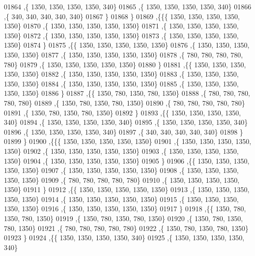 \begin{DoxyCode}
01864    ,\{  1350,  1350,  1350,  1350,   340\}
01865    ,\{  1350,  1350,  1350,  1350,   340\}
01866    ,\{   340,   340,   340,   340,   340\}
01867    \}
01868   \}
01869  ,\{\{\{  1350,  1350,  1350,  1350,  1350\}
01870    ,\{  1350,  1350,  1350,  1350,  1350\}
01871    ,\{  1350,  1350,  1350,  1350,  1350\}
01872    ,\{  1350,  1350,  1350,  1350,  1350\}
01873    ,\{  1350,  1350,  1350,  1350,  1350\}
01874    \}
01875   ,\{\{  1350,  1350,  1350,  1350,  1350\}
01876    ,\{  1350,  1350,  1350,  1350,  1350\}
01877    ,\{  1350,  1350,  1350,  1350,  1350\}
01878    ,\{   780,   780,   780,   780,   780\}
01879    ,\{  1350,  1350,  1350,  1350,  1350\}
01880    \}
01881   ,\{\{  1350,  1350,  1350,  1350,  1350\}
01882    ,\{  1350,  1350,  1350,  1350,  1350\}
01883    ,\{  1350,  1350,  1350,  1350,  1350\}
01884    ,\{  1350,  1350,  1350,  1350,  1350\}
01885    ,\{  1350,  1350,  1350,  1350,  1350\}
01886    \}
01887   ,\{\{  1350,   780,  1350,   780,  1350\}
01888    ,\{   780,   780,   780,   780,   780\}
01889    ,\{  1350,   780,  1350,   780,  1350\}
01890    ,\{   780,   780,   780,   780,   780\}
01891    ,\{  1350,   780,  1350,   780,  1350\}
01892    \}
01893   ,\{\{  1350,  1350,  1350,  1350,   340\}
01894    ,\{  1350,  1350,  1350,  1350,   340\}
01895    ,\{  1350,  1350,  1350,  1350,   340\}
01896    ,\{  1350,  1350,  1350,  1350,   340\}
01897    ,\{   340,   340,   340,   340,   340\}
01898    \}
01899   \}
01900  ,\{\{\{  1350,  1350,  1350,  1350,  1350\}
01901    ,\{  1350,  1350,  1350,  1350,  1350\}
01902    ,\{  1350,  1350,  1350,  1350,  1350\}
01903    ,\{  1350,  1350,  1350,  1350,  1350\}
01904    ,\{  1350,  1350,  1350,  1350,  1350\}
01905    \}
01906   ,\{\{  1350,  1350,  1350,  1350,  1350\}
01907    ,\{  1350,  1350,  1350,  1350,  1350\}
01908    ,\{  1350,  1350,  1350,  1350,  1350\}
01909    ,\{   780,   780,   780,   780,   780\}
01910    ,\{  1350,  1350,  1350,  1350,  1350\}
01911    \}
01912   ,\{\{  1350,  1350,  1350,  1350,  1350\}
01913    ,\{  1350,  1350,  1350,  1350,  1350\}
01914    ,\{  1350,  1350,  1350,  1350,  1350\}
01915    ,\{  1350,  1350,  1350,  1350,  1350\}
01916    ,\{  1350,  1350,  1350,  1350,  1350\}
01917    \}
01918   ,\{\{  1350,   780,  1350,   780,  1350\}
01919    ,\{  1350,   780,  1350,   780,  1350\}
01920    ,\{  1350,   780,  1350,   780,  1350\}
01921    ,\{   780,   780,   780,   780,   780\}
01922    ,\{  1350,   780,  1350,   780,  1350\}
01923    \}
01924   ,\{\{  1350,  1350,  1350,  1350,   340\}
01925    ,\{  1350,  1350,  1350,  1350,   340\}

\end{DoxyCode}
